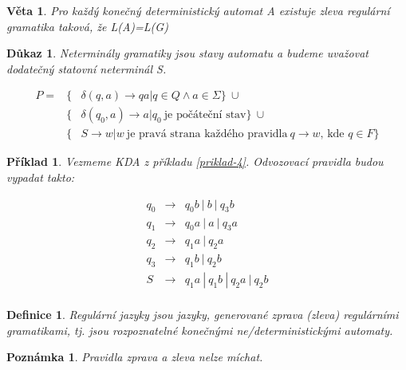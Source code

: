 \documentclass[10pt, a4paper, titlepage]{article}
\theoremstyle{note}
\newtheorem{veta}{\textbf{Věta}}
\newtheorem{definice}{\textbf{Definice}}
\newtheorem{dukaz}{\textbf{Důkaz}}
\newtheorem{priklad}{\textbf{Příklad}}
\newtheorem{poznamka}{\textbf{Poznámka}}
\begin{document}
\begin{veta}
Pro každý konečný deterministický automat \textit{A} existuje zleva regulární gramatika taková, že \textit{L(A)=L(G)}
\end{veta}

\begin{dukaz}
Neterminály gramatiky jsou stavy automatu a budeme uvažovat dodatečný statovní neterminál S.

\begin{eqnarray*}
P = &\lbrace& \delta (q,a) \rightarrow qa | q \in Q \wedge a \in \Sigma \rbrace \ \cup \\
&\lbrace& \delta (q_0,a) \rightarrow a | q_0\ \text{je počáteční stav} \rbrace \ \cup \\
&\lbrace& S \rightarrow w|w \ \text{je pravá strana každého pravidla}\ q \rightarrow w\text{, kde } q \in F \rbrace
\end{eqnarray*}

\end{dukaz}

\begin{priklad}
Vezmeme KDA z příkladu \ref{priklad-4}.
Odvozovací pravidla budou vypadat takto:

\begin{eqnarray*}
q_0 &\rightarrow& q_{0}b\ |\ b\ |\ q_{3}b \\
q_1 &\rightarrow& q_{0}a\ |\ a\ |\ q_{3}a \\
q_2 &\rightarrow& q_{1}a\ |\ q_{2}a \\
q_3 &\rightarrow& q_{1}b\ |\ q_{2}b \\
S &\rightarrow& q_{1}a\ |\ q_{1}b\ |\ q_{2}a\ |\ q_{2}b \\
\end{eqnarray*}

\end{priklad}

\begin{definice}
Regulární jazyky jsou jazyky, generované zprava (zleva) regulárními gramatikami, tj. jsou rozpoznatelné konečnými ne/deterministickými automaty.
\end{definice}

\begin{poznamka}
Pravidla zprava a zleva nelze míchat.
\end{poznamka}
\end{document}
